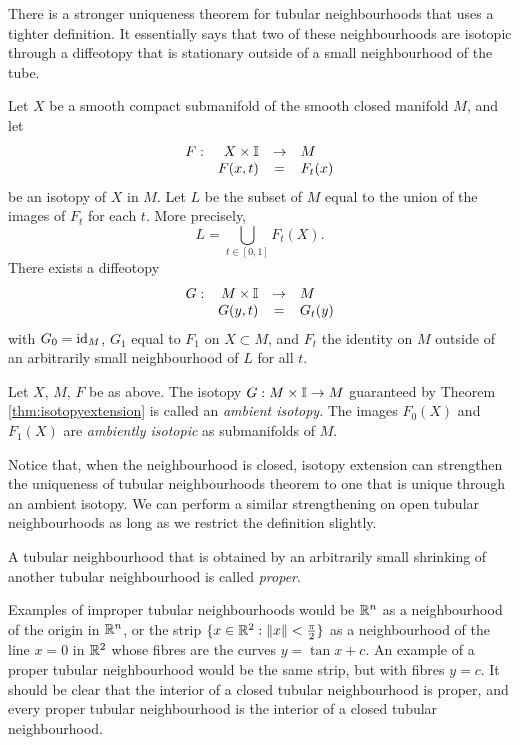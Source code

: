 There is a stronger uniqueness theorem for tubular neighbourhoods that uses a tighter definition.
It essentially says that two of these neighbourhoods are isotopic through a diffeotopy that is stationary outside of a small neighbourhood of the tube.

\begin{theorem}
	\label{thm:isotopyextension}
	Let $X$ be a smooth compact submanifold of the smooth closed manifold $M$, and let
	\[
		\begin{array}{crcl}
			F: & X\times\mathbb{I} & \to & M \\
			   & F(x,t) & = & F_t(x)
		\end{array}
	\]
	be an isotopy of $X$ in $M$.
	Let $L$ be the subset of $M$ equal to the union of the images of $F_t$ for each $t$.
	More precisely,
	\[
		L = \bigcup_{t\in[0,1]} F_t(X).
	\]
	There exists a diffeotopy 
	\[
		\begin{array}{crcl}
			G: & M\times\mathbb{I} & \to & M \\
			   & G(y,t) & = & G_t(y)				
		\end{array}
	\]
	with $G_0=\textrm{id}_{M}$, $G_1$ equal to $F_1$ on $X\subset M$, and $F_t$ the identity on $M$ outside of an arbitrarily small neighbourhood of $L$ for all $t$.
\end{theorem}

\begin{defn}
	\label{def:ambientisotopy}
	Let $X$, $M$, $F$ be as above.
	The isotopy $G:M\times\mathbb{I}\to M$ guaranteed by Theorem \ref{thm:isotopyextension} is called an \emph{ambient isotopy}.
	The images $F_0(X)$ and $F_1(X)$ are \emph{ambiently isotopic} as submanifolds of $M$.
\end{defn}

Notice that, when the neighbourhood is closed, isotopy extension can strengthen the uniqueness of tubular neighbourhoods theorem to one that is unique through an ambient isotopy.
We can perform a similar strengthening on open tubular neighbourhoods as long as we restrict the definition slightly.

\begin{defn}
	A tubular neighbourhood that is obtained by an arbitrarily small shrinking of another tubular neighbourhood is called \emph{proper}.
\end{defn}

Examples of improper tubular neighbourhoods would be $\mathbb{R}^n$ as a neighbourhood of the origin in $\mathbb{R}^n$, or the strip $\{ x\in \mathbb{R}^2 : \left\lVert x \right\rVert< \frac{\pi}{2}\}$ as a neighbourhood of the line $x=0$ in $\mathbb{R}^2$ whose fibres are the curves $y=\tan x + c$.
An example of a proper tubular neighbourhood would be the same strip, but with fibres $y=c$.
It should be clear that the interior of a closed tubular neighbourhood is proper, and every proper tubular neighbourhood is the interior of a closed tubular neighbourhood.

